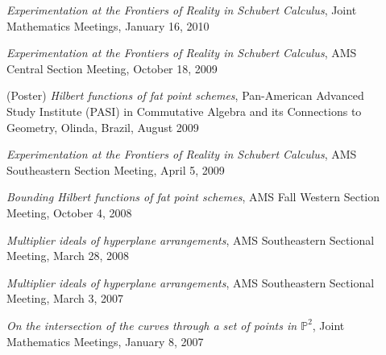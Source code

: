\documentclass[12pt]{article}
\begin{document}
\begin{description}
\item[] \textit{Experimentation at the Frontiers of Reality in Schubert Calculus},
Joint Mathematics Meetings, January 16, 2010

\item[] \textit{Experimentation at the Frontiers of Reality in Schubert Calculus},
AMS Central Section Meeting, October 18, 2009

\item[] (Poster) \textit{Hilbert functions of fat point schemes},
Pan-American Advanced Study Institute (PASI) 
in 
Commutative Algebra and its Connections to Geometry,
Olinda, Brazil, August 2009

\item[] \textit{Experimentation at the Frontiers of Reality in Schubert Calculus},
AMS Southeastern Section Meeting, April 5, 2009

\item[] \textit{Bounding Hilbert functions of fat point schemes},
AMS Fall Western Section Meeting, October 4, 2008

\item[] \textit{Multiplier ideals of hyperplane arrangements},
AMS Southeastern Sectional Meeting, March 28, 2008

\item[] \textit{Multiplier ideals of hyperplane arrangements},
AMS Southeastern Sectional Meeting, March 3, 2007

\item[] \textit{On the intersection of the curves through a set of points in $\mathbb{P}^2$},
Joint Mathematics Meetings, January 8, 2007




\end{description}


\end{document}
